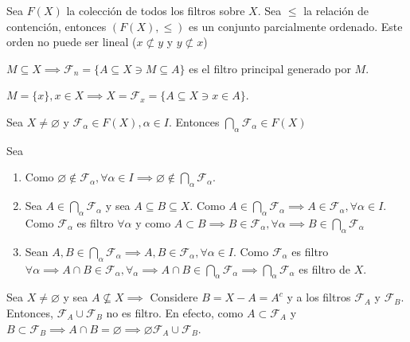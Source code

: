 \begin{nota}
    Sea $F(X)$ la colección de todos los filtros sobre $X$. Sea $\leq$ la relación de contención, entonces $(F(X),\leq)$ es un conjunto parcialmente ordenado. Este orden no puede ser lineal ($x\not\subset y$ y $y\not\subset x$)
\end{nota}


\begin{ejemplo}
    $M\subseteq X\implies \mathcal{F}_n=\{A\subseteq X\ni M\subseteq A\}$ es el filtro principal generado por $M$. 
\end{ejemplo}
\begin{ejemplo}
    $M=\{x\},x\in X\implies X=\mathcal{F}_x=\{A\subseteq X\ni x\in A\}$. 
\end{ejemplo}


\begin{teorema}
    Sea $X\neq \varnothing$ y $\mathcal{F}_\alpha\in F(X),\alpha\in I$. Entonces $\bigcap_\alpha \mathcal{F}_\alpha \in F(X)$
    \begin{dem}
        Sea 
        \begin{enumerate}
            \item Como $\varnothing\not\in \mathcal{F}_\alpha,\forall \alpha \in I\implies \varnothing \not\in \bigcap_\alpha \mathcal{F}_\alpha$.
            \item Sea $A\in \bigcap_\alpha \mathcal{F}_\alpha$ y sea $A\subseteq B\subseteq X$. Como $A\in \bigcap_\alpha \mathcal{F}_\alpha\implies A\in \mathcal{F}_\alpha,\forall \alpha\in I$. Como $\mathcal{F}_\alpha$ es filtro $\forall \alpha$ y como $A\subset B\implies B\in \mathcal{F}_\alpha,\forall \alpha \implies B\in \bigcap_\alpha \mathcal{F}_\alpha $
            \item Sean $A,B\in \bigcap_\alpha \mathcal{F}_\alpha \implies A,B\in \mathcal{F}_\alpha,\forall \alpha \in I$. Como $\mathcal{F}_\alpha$ es filtro $\forall \alpha \implies A\cap B\in \mathcal{F}_\alpha,\forall_\alpha\implies A\cap B \in \bigcap_{\alpha}\mathcal{F}_\alpha\implies \bigcap_\alpha \mathcal{F}_\alpha$ es filtro de $X$.  
        \end{enumerate}
    \end{dem}
\end{teorema}

\begin{nota}
    Sea $X\neq\varnothing$ y sea $A\not\subseteq X\implies$ Considere $B=X-A=A^c$ y a los filtros $\mathcal{F}_A$ y $\mathcal{F}_B$. Entonces, $\mathcal{F}_A\cup \mathcal{F}_B$ no es filtro. En efecto, como $A\subset \mathcal{F}_A$ y $B\subset \mathcal{F}_B\implies A\cap B=\varnothing\implies \varnothing \mathcal{F}_A\cup \mathcal{F}_B$. 
\end{nota}

